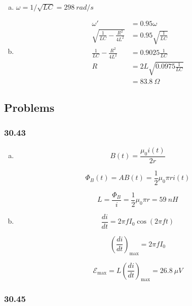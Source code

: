 \documentclass{article}
\begin{document}
\begin{enumerate}[(a)]
  \item $\omega = 1 / \sqrt{L C} = \qty{298}{rad/s}$

  \item

        \begin{align*}
          \omega'                                  & = 0.95 \omega                     \\
          \sqrt{\frac{1}{L C} - \frac{R^2}{4 L^2}} & = 0.95 \sqrt{\frac{1}{L C}}       \\
          \frac{1}{L C} - \frac{R^2}{4 L^2}        & = 0.9025 \frac{1}{L C}            \\
          R                                        & = 2 L \sqrt{0.0975 \frac{1}{L C}} \\
                                                   & = \qty{83.8}{\Omega}
        \end{align*}
\end{enumerate}

\subsection{Problems}

\subsubsection{30.43}

\begin{enumerate}[(a)]
  \item

        \[B(t) = \frac{\mu_0 i(t)}{2 r}\]

        \[\Phi_B(t) = A B(t) = \frac{1}{2} \mu_0 \pi r i(t)\]

        \[L = \frac{\Phi_B}{i} = \frac{1}{2} \mu_0 \pi r = \qty{59}{nH}\]

  \item

        \[\frac{di}{dt} = 2 \pi f I_0 \cos (2 \pi f t)\]

        \[\left( \frac{di}{dt} \right)_\text{max} = 2 \pi f I_0\]

        \[\mathcal{E}_\text{max} = L \left( \frac{di}{dt} \right)_\text{max} = \qty{26.8}{\mu V}\]
\end{enumerate}

\subsubsection{30.45}
\end{document}
